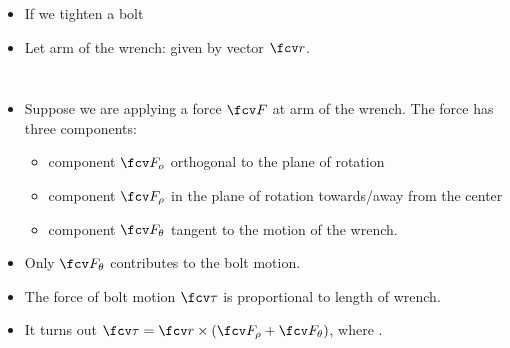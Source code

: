 \begin{frame}
\begin{columns}
\begin{itemize}
\item If we tighten a bolt  
\item<4-> Let arm of the wrench: given by vector $\fcv r$.
\end{itemize}
\end{columns}
\begin{itemize}
\item<4-> Suppose we are applying a force $\fcv F$ at arm of the wrench. The force has three components:
\begin{itemize}
\item<5-> component $\fcv F_o$ orthogonal to the plane of rotation
\item<6-> component $\fcv F_\rho$ in the plane of rotation towards/away from the center
\item<7-> component $\fcv F_\theta$ tangent to the motion of the wrench.
\end{itemize}
\item<8-> Only $\fcv F_\theta$ contributes to the bolt motion.
\item<9-> The force of bolt motion $\fcv \tau$ is proportional to length of wrench.
\item<10-> It turns out $\fcv \tau = \fcv r \times (\fcv F_\rho+\fcv F_\theta)$, where .
\end{itemize}
\end{frame}
